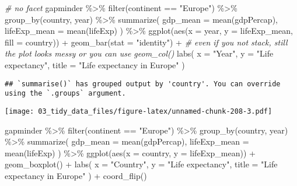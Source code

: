 \documentclass[
]{book}
\newenvironment{Shaded}{\begin{snugshade}}{\end{snugshade}}
\newcommand{\AttributeTok}[1]{\textcolor[rgb]{0.77,0.63,0.00}{#1}}
\newcommand{\CommentTok}[1]{\textcolor[rgb]{0.56,0.35,0.01}{\textit{#1}}}
\newcommand{\FunctionTok}[1]{\textcolor[rgb]{0.00,0.00,0.00}{#1}}
\newcommand{\NormalTok}[1]{#1}
\newcommand{\SpecialCharTok}[1]{\textcolor[rgb]{0.00,0.00,0.00}{#1}}
\newcommand{\StringTok}[1]{\textcolor[rgb]{0.31,0.60,0.02}{#1}}
\begin{document}
\begin{Shaded}
\begin{Highlighting}[]
\CommentTok{\# no facet}
\NormalTok{gapminder }\SpecialCharTok{\%\textgreater{}\%}
  \FunctionTok{filter}\NormalTok{(continent }\SpecialCharTok{==} \StringTok{"Europe"}\NormalTok{) }\SpecialCharTok{\%\textgreater{}\%}
  \FunctionTok{group\_by}\NormalTok{(country, year) }\SpecialCharTok{\%\textgreater{}\%}
  \FunctionTok{summarize}\NormalTok{(}
    \AttributeTok{gdp\_mean =} \FunctionTok{mean}\NormalTok{(gdpPercap),}
    \AttributeTok{lifeExp\_mean =} \FunctionTok{mean}\NormalTok{(lifeExp)}
\NormalTok{  ) }\SpecialCharTok{\%\textgreater{}\%}
  \FunctionTok{ggplot}\NormalTok{(}\FunctionTok{aes}\NormalTok{(}\AttributeTok{x =}\NormalTok{ year, }\AttributeTok{y =}\NormalTok{ lifeExp\_mean, }\AttributeTok{fill =}\NormalTok{ country)) }\SpecialCharTok{+}
  \FunctionTok{geom\_bar}\NormalTok{(}\AttributeTok{stat =} \StringTok{"identity"}\NormalTok{) }\SpecialCharTok{+} \CommentTok{\# even if you not stack, still the plot looks messy or you can use geom\_col()}
  \FunctionTok{labs}\NormalTok{(}
    \AttributeTok{x =} \StringTok{"Year"}\NormalTok{,}
    \AttributeTok{y =} \StringTok{"Life expectancy"}\NormalTok{,}
    \AttributeTok{title =} \StringTok{"Life expectancy in Europe"}
\NormalTok{  )}
\end{Highlighting}
\end{Shaded}

\begin{verbatim}
## `summarise()` has grouped output by 'country'. You can override using the `.groups` argument.
\end{verbatim}

\texttt{[image: 03\_tidy\_data\_files/figure-latex/unnamed-chunk-208-3.pdf]}

\begin{Shaded}
\begin{Highlighting}[]
\NormalTok{gapminder }\SpecialCharTok{\%\textgreater{}\%}
  \FunctionTok{filter}\NormalTok{(continent }\SpecialCharTok{==} \StringTok{"Europe"}\NormalTok{) }\SpecialCharTok{\%\textgreater{}\%}
  \FunctionTok{group\_by}\NormalTok{(country, year) }\SpecialCharTok{\%\textgreater{}\%}
  \FunctionTok{summarize}\NormalTok{(}
    \AttributeTok{gdp\_mean =} \FunctionTok{mean}\NormalTok{(gdpPercap),}
    \AttributeTok{lifeExp\_mean =} \FunctionTok{mean}\NormalTok{(lifeExp)}
\NormalTok{  ) }\SpecialCharTok{\%\textgreater{}\%}
  \FunctionTok{ggplot}\NormalTok{(}\FunctionTok{aes}\NormalTok{(}\AttributeTok{x =}\NormalTok{ country, }\AttributeTok{y =}\NormalTok{ lifeExp\_mean)) }\SpecialCharTok{+}
  \FunctionTok{geom\_boxplot}\NormalTok{() }\SpecialCharTok{+}
  \FunctionTok{labs}\NormalTok{(}
    \AttributeTok{x =} \StringTok{"Country"}\NormalTok{,}
    \AttributeTok{y =} \StringTok{"Life expectancy"}\NormalTok{,}
    \AttributeTok{title =} \StringTok{"Life expectancy in Europe"}
\NormalTok{  ) }\SpecialCharTok{+}
  \FunctionTok{coord\_flip}\NormalTok{()}
\end{Highlighting}
\end{Shaded}
\end{document}
